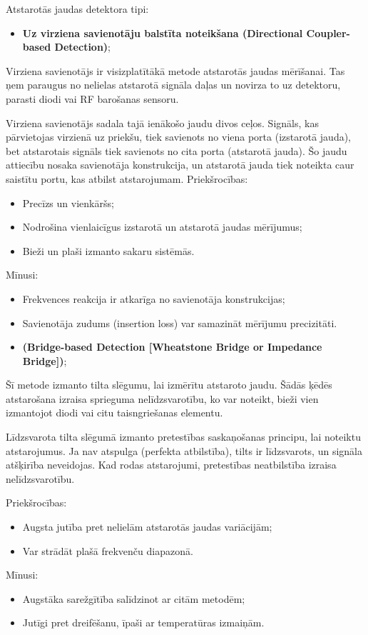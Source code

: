 Atstarotās jaudas detektora tipi:
\begin{itemize}
    \item \textbf{Uz virziena savienotāju balstīta noteikšana (Directional Coupler-based Detection)};
\end{itemize}

Virziena savienotājs ir visizplatītākā metode atstarotās jaudas mērīšanai. Tas ņem paraugus no nelielas atstarotā signāla daļas un novirza to uz detektoru, parasti diodi vai RF barošanas sensoru.

Virziena savienotājs sadala tajā ienākošo jaudu divos ceļos. Signāls, kas pārvietojas virzienā uz priekšu, tiek savienots no viena porta (izstarotā jauda), bet atstarotais signāls tiek savienots no cita porta (atstarotā jauda). Šo jaudu attiecību nosaka savienotāja konstrukcija, un atstarotā jauda tiek noteikta caur saistītu portu, kas atbilst atstarojumam.
Priekšrocības:
\begin{itemize}
    \item Precīzs un vienkāršs;
    \item Nodrošina vienlaicīgus izstarotā un atstarotā jaudas mērījumus;
    \item Bieži un plaši izmanto sakaru sistēmās.
\end{itemize}
Mīnusi:
\begin{itemize}
    \item Frekvences reakcija ir atkarīga no savienotāja konstrukcijas;
    \item Savienotāja zudums (insertion loss) var samazināt mērījumu precizitāti.
\end{itemize}

\begin{itemize}
    \item \textbf{(Bridge-based Detection [Wheatstone Bridge or Impedance Bridge])};
\end{itemize}
Šī metode izmanto tilta slēgumu, lai izmērītu atstaroto jaudu. Šādās ķēdēs atstarošana izraisa sprieguma nelīdzsvarotību, ko var noteikt, bieži vien izmantojot diodi vai citu taisngriešanas elementu.

Līdzsvarota tilta slēgumā izmanto pretestības saskaņošanas principu, lai noteiktu atstarojumus. Ja nav atspulga (perfekta atbilstība), tilts ir līdzsvarots, un signāla atšķirība neveidojas. Kad rodas atstarojumi, pretestības neatbilstība izraisa nelīdzsvarotību.

Priekšrocības:
\begin{itemize}
    \item Augsta jutība pret nelielām atstarotās jaudas variācijām;
    \item Var strādāt plašā frekvenču diapazonā.
\end{itemize}
Mīnusi:
\begin{itemize}
    \item Augstāka sarežgītība salīdzinot ar citām metodēm;
    \item Jutīgi pret dreifēšanu, īpaši ar temperatūras izmaiņām.
\end{itemize}

